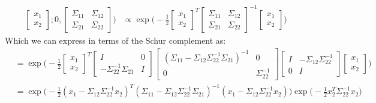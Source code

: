 \documentclass{article}
\begin{document}
\begin{enumerate}[(a)]
\begin{enumerate}[(i)]
\begin{align*}
\begin{bmatrix}
            x_1 \\
            x_2
        \end{bmatrix}; 0 , \begin{bmatrix}
            \Sigma_{11} & \Sigma_{12} \\ 
            \Sigma_{21} & \Sigma_{22}
        \end{bmatrix}
        \biggr) &\propto \exp\biggl(-\frac{1}{2}\begin{bmatrix}
            x_1 \\
            x_2
        \end{bmatrix}^T\begin{bmatrix}
            \Sigma_{11} & \Sigma_{12} \\ 
            \Sigma_{21} & \Sigma_{22}
        \end{bmatrix}^{-1}\begin{bmatrix}
            x_1 \\
            x_2
        \end{bmatrix}
        \biggr)
    \end{align*}
    Which we can express in terms of the Schur complement as: 
    \begin{align*}
        &= \exp\biggl(-\frac{1}{2}\begin{bmatrix}
            x_1 \\
            x_2
        \end{bmatrix}^T\begin{bmatrix}
            I & 0 \\ 
            -\Sigma_{22}^{-1}\Sigma_{21} & I
        \end{bmatrix}
        \begin{bmatrix}
            (\Sigma_{11} - \Sigma_{12}\Sigma_{22}^{-1}\Sigma_{21})^{-1}& 0 \\ 
            0 & \Sigma_{22}^{-1}
        \end{bmatrix}
        \begin{bmatrix}
            I & -\Sigma_{12}\Sigma_{22}^{-1} \\ 
            0 & I
        \end{bmatrix}
        \begin{bmatrix}
            x_1 \\
            x_2
        \end{bmatrix}
        \biggr) \\[1.0ex]
        &= \exp \biggl(-\frac{1}{2}(x_1 - \Sigma_{12}\Sigma_{22}^{-1}x_2)^T(\Sigma_{11} - \Sigma_{12}\Sigma_{22}^{-1}\Sigma_{21})^{-1}(x_1 - \Sigma_{12}\Sigma_{22}^{-1}x_2)\biggr)\exp\biggl(-\frac{1}{2}x_2^T\Sigma_{22}^{-1}x_2\biggr)

\end{align*}
\end{enumerate}
\end{enumerate}
\end{document}

